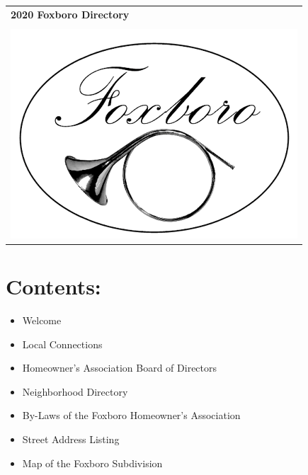 \documentclass[10pt]{report}
\begin{document}
\setcounter{secnumdepth}{0}

\begin{center}
\begin{tabular}{ p{} }
	{\Huge {\bf 2020 Foxboro Directory}} \\
	\\
	\midrule
	\includegraphics[]{foxboro_logo.png} \\
	\midrule
\end{tabular}
\end{center}


\section{Contents:}
\begin{itemize}
	\item Welcome
	\item Local Connections
	\item Homeowner’s Association Board of Directors
	\item Neighborhood Directory
	\item By-Laws of the Foxboro Homeowner’s Association
	\item Street Address Listing
	\item Map of the Foxboro Subdivision
\end{itemize}
\newpage



\newpage


\newpage


\newpage


\newpage
\end{document}
